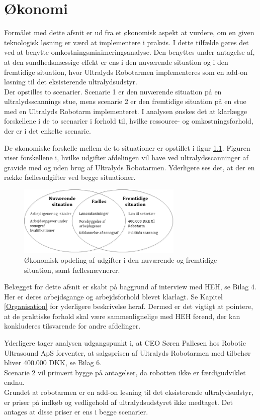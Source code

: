 \chapter{Økonomi} \label{Okonomi}
Formålet med dette afsnit er ud fra et økonomisk aspekt at vurdere, om en given teknologisk løsning er værd at implementere i praksis. I dette tilfælde gøres det ved at benytte omkostningsminimeringsanalyse. Den benyttes under antagelse af, at den sundhedsmæssige effekt er ens i den nuværende situation og i den fremtidige situation, hvor Ultralyds Robotarmen implementeres som en add-on løsning til det eksisterende ultralydsudstyr. \\
Der opstilles to scenarier. Scenarie 1 er den nuværende situation på en ultralydsscannings stue, mens scenarie 2 er den fremtidige situation på en stue med en Ultralyds Robotarm implementeret. I analysen ønskes det at klarlægge forskellene i de to scenarier i forhold til, hvilke ressource- og omkostningsforhold, der er i det enkelte scenarie. 

De økonomiske forskelle mellem de to situationer er opstillet i figur \ref{ModelOkonomi}. Figuren viser forskellene i, hvilke udgifter afdelingen vil have ved ultralydsscanninger af gravide med og uden brug af Ultralyds Robotarmen. Yderligere ses det, at der en række fællesudgifter ved begge situationer.  

\begin{figure}[H]\centering
	\includegraphics[width = 0.7\textwidth]{Figurer/ModelOkonomi}
	\caption{Økonomisk opdeling af udgifter i den nuværende og fremtidige situation, samt fællesnævnerer.}
	\label{ModelOkonomi}
\end{figure}

Belægget for dette afsnit er skabt på baggrund af interview med HEH, se Bilag 4. Her er deres arbejdsgange og arbejdsforhold blevet klarlagt. Se Kapitel \ref{Organisation} for yderligere beskrivelse heraf. Dermed er det vigtigt at pointere, at de praktiske forhold skal være sammenlignelige med HEH førend, der kan konkluderes tilsvarende for andre afdelinger.

Yderligere tager analysen udgangspunkt i, at CEO Søren Pallesen hos Robotic Ultrasound ApS forventer, at salgsprisen af Ultralyds Robotarmen med tilbehør bliver 400.000 DKK, se Bilag 6. \\
Scenarie 2 vil primært bygge på antagelser, da robotten ikke er færdigudviklet endnu. \\
Grundet at robotarmen er en add-on løsning til det eksisterende ultralydsudstyr, er priser på indkøb og vedligehold af ultralydsudstyret ikke medtaget. Det antages at disse priser er ens i begge scenarier. 

